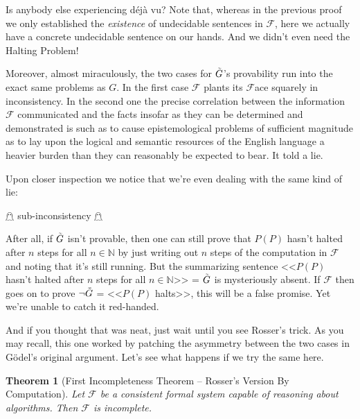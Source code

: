 \documentclass{article}
\newtheorem{theorem}{Theorem}
\newcommand{\F}{\ensuremath{\mathcal{F}}}
\newcommand{\iGoedel}{\ensuremath{\accentset{\scalebox{0.35}{$\infty$}}{G}}}
\begin{document}
Is anybody else experiencing déjà vu? Note that, whereas in the previous proof we only established the \textit{existence} of undecidable sentences in $\F$, here we actually have a concrete undecidable sentence on our hands. And we didn't even need the Halting Problem!

Moreover, almost miraculously, the two cases for $\iGoedel$'s provability run into the exact same problems as $G$. In the first case $\F$ plants its $\F$ace squarely in inconsistency. In the second one the precise correlation between the information $\F$ communicated and the facts insofar as they can be determined and demonstrated is such as to cause epistemological problems of sufficient magnitude as to lay upon the logical and semantic resources of the English language a heavier burden than they can reasonably be expected to bear. It told a lie.\cite{yes-prime-minister}

Upon closer inspection we notice that we're even dealing with the same kind of lie:
\begin{center}
$\mathghost$ sub-inconsistency $\mathghost$
\end{center}
After all, if $\iGoedel$ isn't provable, then one can still prove that $P(P)$ hasn't halted after $n$ steps for all $n\in\mathbb{N}$ by just writing out $n$ steps of the computation in $\F$ and noting that it's still running. But the summarizing sentence <<$P(P)$ hasn't halted after $n$ steps for all $n\in\mathbb{N}$>> = $\iGoedel$ is mysteriously absent. If $\F$ then goes on to prove $\neg \iGoedel$ = <<$P(P)$ halts>>, this will be a false promise. Yet we're unable to catch it red-handed.

And if you thought that was neat, just wait until you see Rosser's trick. As you may recall, this one worked by patching the asymmetry between the two cases in Gödel's original argument. Let's see what happens if we try the same here.

\begin{theorem}[First Incompleteness Theorem -- Rosser's Version By Computation]
Let $\F$ be a consistent formal system capable of reasoning about algorithms. Then $\F$ is incomplete.
\end{theorem}
\end{document}
